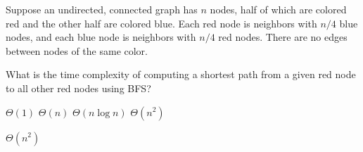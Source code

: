 \begin{prob}

    Suppose an undirected, connected graph has $n$ nodes, half of which are
    colored red and the other half are colored blue. Each red node is neighbors
    with $n/4$ blue nodes, and each blue node is neighbors with $n/4$ red
    nodes. There are no edges between nodes of the same color.

    What is the time complexity of computing a shortest path from a given red
    node to all other red nodes using BFS?

    \begin{choices}
        \choice $\Theta(1)$
        \choice $\Theta(n)$
        \choice $\Theta(n \log n)$
        \correctchoice $\Theta(n^2)$
    \end{choices}

    \begin{soln}
        $\Theta(n^2)$
    \end{soln}


\end{prob}
